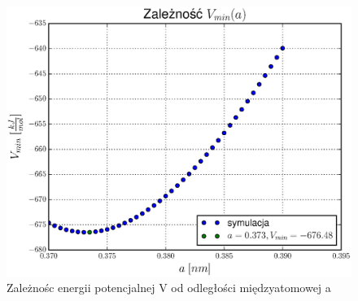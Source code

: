\documentclass[10]{article}
\begin{document}
\begin{figure}[H]
\begin{center}
\includegraphics[scale=0.6]{a_minV.eps}
\caption{Zależnośc energii potencjalnej V od odległości międzyatomowej a} \label{wykres:minV(a)}
\end{center}
\end{figure}
\end{document}
